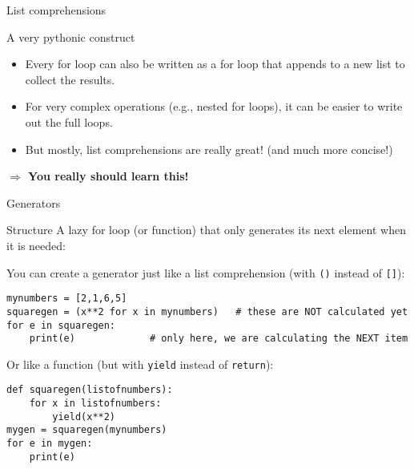 \begin{frame}[fragile]{List comprehensions}
	\begin{alertblock}{A very pythonic construct}
		\begin{itemize}
			\item Every for loop can also be written as a for loop that appends to a new list to collect the results. 
			\item For very complex operations (e.g., nested for loops), it can be easier to write out the full loops. 
			\item But mostly, list comprehensions are really great! (and much more concise!)
		\end{itemize}
	\end{alertblock}
\textbf{$\Rightarrow$ You really should learn this!}
	\end{frame}



\begin{frame}[fragile]{Generators}
\begin{block}{Structure}
	A lazy for loop (or function) that only generates its next element when it is needed:
\end{block}
\footnotesize You can create a generator just like a list comprehension (with \texttt{()} instead of \texttt{[]}):
\begin{verbatim}
mynumbers = [2,1,6,5]
squaregen = (x**2 for x in mynumbers)   # these are NOT calculated yet
for e in squaregen:
    print(e)             # only here, we are calculating the NEXT item
\end{verbatim}
\pause
Or like a function (but with \texttt{yield} instead of \texttt{return}):
\begin{verbatim}
def squaregen(listofnumbers):
    for x in listofnumbers:
        yield(x**2)
mygen = squaregen(mynumbers)
for e in mygen:
    print(e)
\end{verbatim}

\end{frame}


